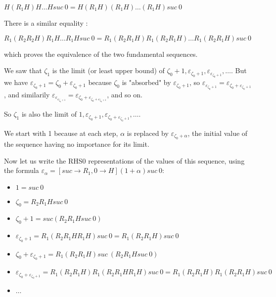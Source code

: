 \documentclass[10pt]{article}
\begin{document}
\( H (R_1 H) H \ldots H suc\ 0 = H (R_1 H) (R_1 H) \ldots (R_1 H) suc\ 0 \)

There is a similar equality :

\( R_1 (R_2 R_2 H) R_1 H \ldots R_1 H suc\ 0 = R_1 (R_2 R_1 H) R_1 (R_2 R_1 H) \ldots R_1 (R_2 R_1 H) suc\ 0 \)

which proves the equivalence of the two fundamental sequences.

We saw that \( \zeta_1 \) is the limit (or least upper bound) of \( \zeta_0+1, \varepsilon_{\zeta_0+1}, \varepsilon_{\varepsilon_{\zeta_0+1}}, \ldots \). But we have \( \varepsilon_{\zeta_0+1} = \zeta_0+\varepsilon_{\zeta_0+1} \) because \( \zeta_0 \) is "absorbed" by \( \varepsilon_{\zeta_0+1} \),  so \( \varepsilon_{\varepsilon_{\zeta_0+1}} = \varepsilon_{\zeta_0+\varepsilon_{\zeta_0+1}} \), and similarily \( \varepsilon_{\varepsilon_{\varepsilon_{\zeta_0+1}}} = \varepsilon_{\zeta_0+\varepsilon_{\zeta_0+\varepsilon_{\zeta_0+1}}} \), and so on.

So \( \zeta_1 \) is also the limit of \( 1, \varepsilon_{\zeta_0+1}, \varepsilon_{\zeta_0+\varepsilon_{\zeta_0+1}}, \ldots \). 

We start with 1 because at each step, \( \alpha \) is replaced by \( \varepsilon_{\zeta_0+\alpha} \), the initial value of the sequence having no importance for its limit.

Now let us write the RHS0 representations of the values of this sequence, using the formula \( \varepsilon_\alpha = [suc \rightarrow R_1, 0 \rightarrow H] (1+\alpha) suc\ 0 \):

\begin{itemize}
     \setlength{\itemsep}{1pt}
     \setlength{\parskip}{0pt}
     \setlength{\parsep}{0pt}

\item \( 1 = suc\ 0 \)
\item \( \zeta_0 = R_2 R_1 H suc\ 0 \)
\item \( \zeta_0+1 = suc (R_2 R_1 H suc\ 0) \)
\item \( \varepsilon_{\zeta_0+1} = R_1 (R_2 R_1 H R_1 H) suc\ 0 = R_1 (R_2 R_1 H) suc\ 0 \)
\item \( \zeta_0+\varepsilon_{\zeta_0+1} = R_1 (R_2 R_1 H) suc\ (R_2 R_1 H suc\ 0) \)
\item \( \varepsilon_{\zeta_0+\varepsilon_{\zeta_0+1}} = R_1 (R_2 R_1 H) R_1 (R_2 R_1 H R_1 H) suc\ 0 = R_1 (R_2 R_1 H) R_1 (R_2 R_1 H) suc\ 0 \)
\item \( \ldots \)

\end{itemize}
\end{document}

